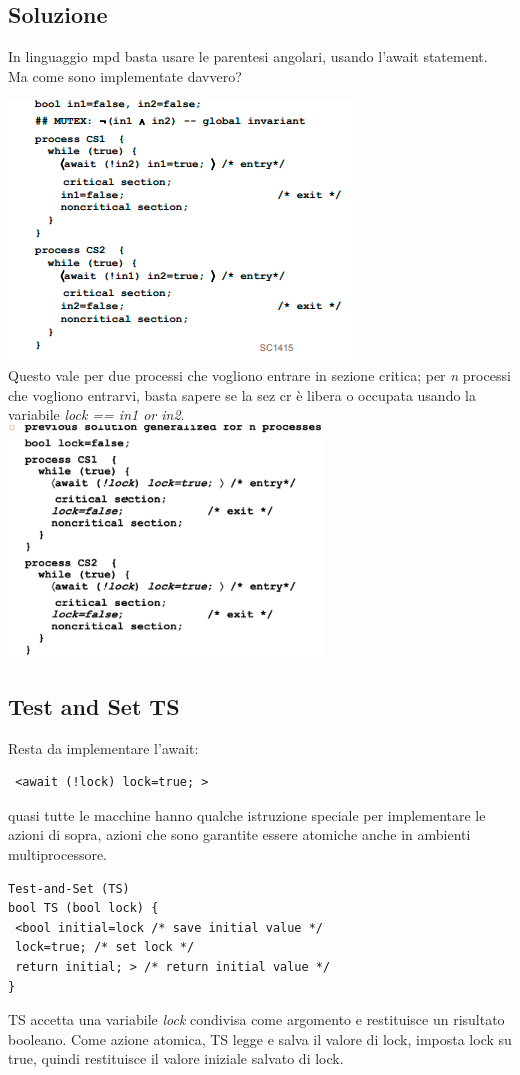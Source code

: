 \documentclass[10pt,a4paper]{book}
\begin{document}
\subsection{Soluzione}
In linguaggio mpd basta usare le parentesi angolari, usando l'await statement. Ma come sono implementate davvero?

\includegraphics[scale=1]{img/cs.png} \\
Questo vale per due processi che vogliono entrare in sezione critica; per \textit{n} processi che vogliono entrarvi, basta sapere se la sez cr è libera o occupata usando la variabile \textit{lock == in1 or in2}.\\

\includegraphics[scale=1]{img/cs2.png} \\

\subsection{Test and Set TS}
Resta da implementare l'await: \begin{verbatim} <await (!lock) lock=true; >\end{verbatim}

quasi tutte le macchine hanno qualche istruzione speciale per implementare le azioni di sopra, azioni che sono garantite essere atomiche anche in ambienti multiprocessore.
\begin{verbatim}
Test-and-Set (TS)
bool TS (bool lock) {
 <bool initial=lock /* save initial value */
 lock=true; /* set lock */
 return initial; > /* return initial value */
}
\end{verbatim}
TS accetta una variabile \textit{lock} condivisa come argomento e restituisce un risultato booleano. Come azione atomica, TS legge e salva il valore di lock, imposta lock su true, quindi restituisce il valore iniziale salvato di lock. 
\end{document}

